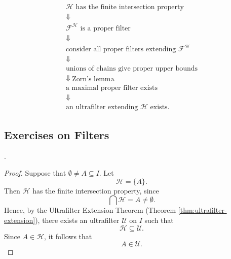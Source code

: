 {\[
\begin{array}{c}
\mathcal{H}\text{ has the finite intersection property}
\\[1mm]
\Downarrow
\\[1mm]
\mathcal{F}^{\mathcal{H}}\text{ is a proper filter}
\\[1mm]
\Downarrow
\\[1mm]
\text{consider all proper filters extending }\mathcal{F}^{\mathcal{H}}
\\[1mm]
\Downarrow
\\[1mm]
\text{unions of chains give proper upper bounds}
\\[1mm]
\Downarrow\ \text{Zorn's lemma}
\\[1mm]
\text{a maximal proper filter exists}
\\[1mm]
\Downarrow
\\[1mm]
\text{an ultrafilter extending }\mathcal{H}\text{ exists.}
\end{array}
\]

\subsection{Exercises on Filters}
. 
\begin{proof}
Suppose that \(\emptyset \neq A \subseteq I\). Let
\[
\mathcal{H}=\{A\}.
\]
Then \(\mathcal{H}\) has the finite intersection property, since
\[
\bigcap \mathcal{H}=A\neq\emptyset.
\]
Hence, by the Ultrafilter Extension Theorem (Theorem \ref{thm:ultrafilter-extension}), there exists an ultrafilter
\(\mathcal{U}\) on \(I\) such that
\[
\mathcal{H}\subseteq\mathcal{U}.
\]
Since \(A\in\mathcal{H}\), it follows that
\[
A\in\mathcal{U}.
\]
\end{proof}

}
